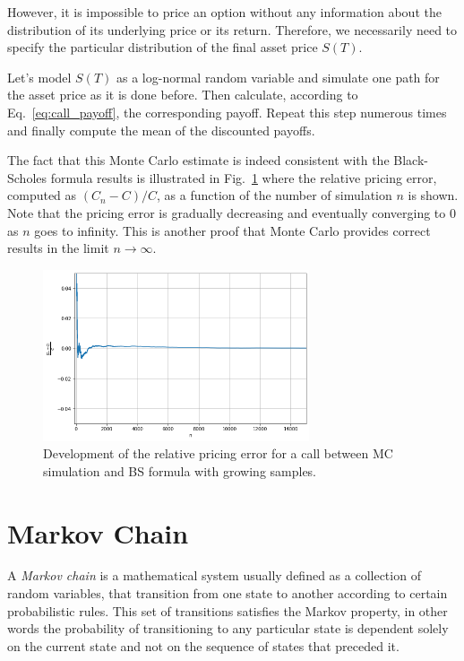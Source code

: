 However, it is impossible to price an option without any information about the distribution of its underlying price or its return. Therefore, we necessarily need to specify the particular distribution of the final asset price $S(T)$. 

Let's model $S(T)$ as a log-normal random variable and simulate one path for the asset price as it is done before. Then calculate, according to Eq.~\ref{eq:call_payoff}, the corresponding payoff. Repeat this step numerous times and finally compute the mean of the discounted payoffs. 

The fact that this Monte Carlo estimate is indeed consistent with the Black-Scholes formula results is illustrated in Fig.~\ref{fig:error_BS} where the relative pricing error, computed as $(C_n − C)/C$, as a function of the number of simulation $n$ is shown. Note that the pricing error is gradually decreasing and eventually converging to 0 as $n$ goes to infinity. This is another proof that Monte Carlo provides correct results in the limit $n\rightarrow\infty$.

\begin{figure}[htb]
\centering
\includegraphics[width=0.7\textwidth]{figures/call_pricing_error.png}
\caption{Development of the relative pricing error for a call between MC simulation and BS formula with growing samples.}
\label{fig:error_BS}
\end{figure}

\section{Markov Chain}
\label{sec:markov_chain}
A \emph{Markov chain} is a mathematical system usually defined as a collection of random variables, that transition from one state to another according to certain probabilistic rules. This set of transitions satisfies the Markov property, in other words the probability of transitioning to any particular state is dependent solely on the current state and not on the sequence of states that preceded it. 

